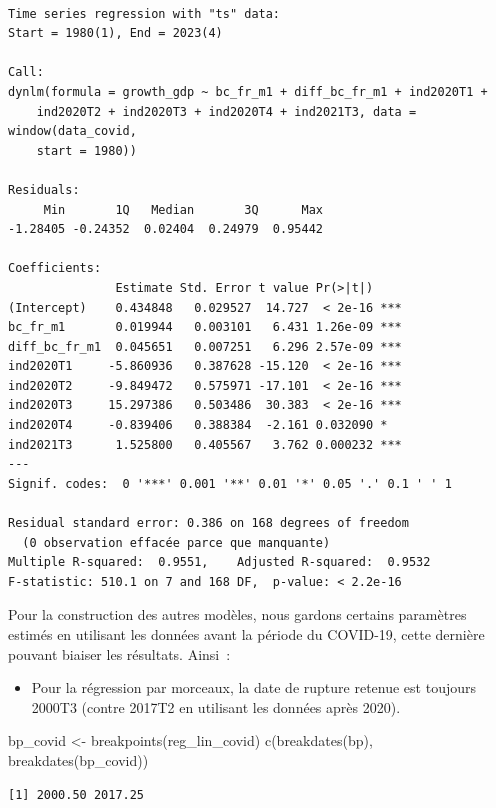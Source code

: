 \documentclass[
  a4paper,
  DIV=11,
  numbers=noendperiod,
  french]{scrartcl}
\newenvironment{Shaded}{\begin{snugshade}}{\end{snugshade}}
\newcommand{\FunctionTok}[1]{\textcolor[rgb]{0.28,0.35,0.67}{#1}}
\newcommand{\NormalTok}[1]{\textcolor[rgb]{0.00,0.23,0.31}{#1}}
\newcommand{\OtherTok}[1]{\textcolor[rgb]{0.00,0.23,0.31}{#1}}
\providecommand{\tightlist}{%
  \setlength{\itemsep}{0pt}\setlength{\parskip}{0pt}}\usepackage{longtable,booktabs,array}
\newcommand\1{{\mathds 1}}
\theoremstyle{remark}
\begin{document}
\begin{verbatim}

Time series regression with "ts" data:
Start = 1980(1), End = 2023(4)

Call:
dynlm(formula = growth_gdp ~ bc_fr_m1 + diff_bc_fr_m1 + ind2020T1 + 
    ind2020T2 + ind2020T3 + ind2020T4 + ind2021T3, data = window(data_covid, 
    start = 1980))

Residuals:
     Min       1Q   Median       3Q      Max 
-1.28405 -0.24352  0.02404  0.24979  0.95442 

Coefficients:
               Estimate Std. Error t value Pr(>|t|)    
(Intercept)    0.434848   0.029527  14.727  < 2e-16 ***
bc_fr_m1       0.019944   0.003101   6.431 1.26e-09 ***
diff_bc_fr_m1  0.045651   0.007251   6.296 2.57e-09 ***
ind2020T1     -5.860936   0.387628 -15.120  < 2e-16 ***
ind2020T2     -9.849472   0.575971 -17.101  < 2e-16 ***
ind2020T3     15.297386   0.503486  30.383  < 2e-16 ***
ind2020T4     -0.839406   0.388384  -2.161 0.032090 *  
ind2021T3      1.525800   0.405567   3.762 0.000232 ***
---
Signif. codes:  0 '***' 0.001 '**' 0.01 '*' 0.05 '.' 0.1 ' ' 1

Residual standard error: 0.386 on 168 degrees of freedom
  (0 observation effacée parce que manquante)
Multiple R-squared:  0.9551,    Adjusted R-squared:  0.9532 
F-statistic: 510.1 on 7 and 168 DF,  p-value: < 2.2e-16
\end{verbatim}

Pour la construction des autres modèles, nous gardons certains
paramètres estimés en utilisant les données avant la période du
COVID-19, cette dernière pouvant biaiser les résultats. Ainsi~:

\begin{itemize}
\tightlist
\item
  Pour la régression par morceaux, la date de rupture retenue est
  toujours 2000T3 (contre 2017T2 en utilisant les données après 2020).
\end{itemize}

\begin{Shaded}
\begin{Highlighting}[]
\NormalTok{bp\_covid }\OtherTok{\textless{}{-}} \FunctionTok{breakpoints}\NormalTok{(reg\_lin\_covid)}
\FunctionTok{c}\NormalTok{(}\FunctionTok{breakdates}\NormalTok{(bp), }\FunctionTok{breakdates}\NormalTok{(bp\_covid))}
\end{Highlighting}
\end{Shaded}

\begin{verbatim}
[1] 2000.50 2017.25
\end{verbatim}
\end{document}
